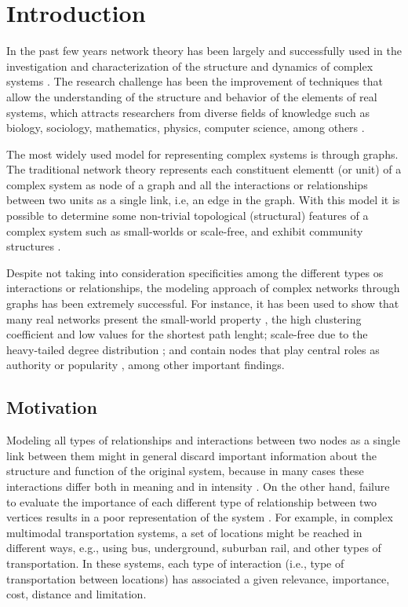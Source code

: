 \chapter{Introduction}
\label{cap:Intro}

In the past few years network theory has been largely and successfully used in the investigation and characterization of the structure and dynamics of complex systems \cite{Strogatz2001, Newman2003}. The research challenge has been the improvement of techniques that allow the understanding of the structure and behavior of the elements of real systems, which attracts researchers from diverse fields of knowledge such as biology, sociology, mathematics, physics, computer science, among others \cite{Motter2012,Orman2012,Zafarani2015,Chakraborty2017}.

The most widely used model for representing complex systems is through graphs. The traditional network theory represents each constituent elementt (or unit) of a complex system as node of a graph and all the interactions or relationships between two units as a single link, i.e, an edge in the graph. With this model it is possible to determine some non-trivial topological (structural) features of a complex system such as small-worlds or scale-free, and exhibit community structures \cite{PARK201632}.

Despite not taking into consideration specificities among the different types os interactions or relationships, the modeling approach of complex networks through graphs has been extremely successful. For instance, it has been used to show that many real networks present the small-world property \cite{Watts1998, Porter:2012}, the high clustering coefficient and low values for the shortest path lenght; scale-free due to the heavy-tailed degree distribution \cite{Barabasi509, Clauset2009}; and  contain nodes that play central roles as authority or popularity \cite{Newman:2010, Wasserman1994}, among other important findings.



\section{Motivation}
\label{sec:motivation}

Modeling all types of relationships and interactions between two nodes as a single link between them might in general discard important information about the structure and function of the original system, because in many cases these interactions differ both in meaning and in intensity \cite{Darmon2015}. On the other hand, failure to evaluate the importance of each different type of relationship between two vertices results in a poor representation of the system \cite{Szell2010}. For example, in complex multimodal transportation systems, a set of locations might be reached in different ways, e.g., using bus, underground, suburban rail, and other types of transportation. In these systems, each type of interaction (i.e., type of transportation between locations) has associated a given relevance, importance, cost, distance and limitation.

